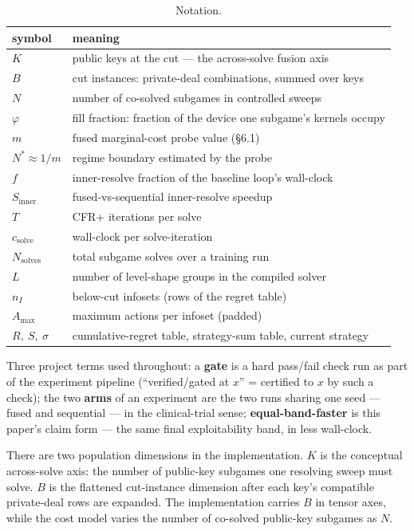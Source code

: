\documentclass[11pt]{article}
\begin{document}
\begin{table}[t]
\centering
\caption{Notation.}
\label{tab:notation}
\small
\begin{tabular}{ll}
\toprule
symbol & meaning \\
\midrule
$K$ & public keys at the cut --- the across-solve fusion axis \\
$B$ & cut instances: private-deal combinations, summed over keys \\
$N$ & number of co-solved subgames in controlled sweeps \\
$\varphi$ & fill fraction: fraction of the device one subgame's kernels occupy \\
$m$ & fused marginal-cost probe value (\S6.1) \\
$N^* \approx 1/m$ & regime boundary estimated by the probe \\
$f$ & inner-resolve fraction of the baseline loop's wall-clock \\
$S_{\text{inner}}$ & fused-vs-sequential inner-resolve speedup \\
$T$ & CFR+ iterations per solve \\
$c_{\text{solve}}$ & wall-clock per solve-iteration \\
$N_{\text{solves}}$ & total subgame solves over a training run \\
$L$ & number of level-shape groups in the compiled solver \\
$n_I$ & below-cut infosets (rows of the regret table) \\
$A_{\max}$ & maximum actions per infoset (padded) \\
$R,\ S,\ \sigma$ & cumulative-regret table, strategy-sum table, current strategy \\
\bottomrule
\end{tabular}
\end{table}

Three project terms used throughout: a \textbf{gate} is a hard pass/fail check
run as part of the experiment pipeline (``verified/gated at $x$'' = certified to $x$ by
such a check); the two \textbf{arms} of an experiment are the two runs sharing one seed
--- fused and sequential --- in the clinical-trial sense; \textbf{equal-band-faster} is
this paper's claim form --- the same final exploitability band, in less wall-clock.

There are two population dimensions in the implementation. $K$ is the conceptual
across-solve axis: the number of public-key subgames one resolving sweep must solve.
$B$ is the flattened cut-instance dimension after each key's compatible private-deal
rows are expanded. The implementation carries $B$ in tensor axes, while the cost model
varies the number of co-solved public-key subgames as $N$.
\end{document}
